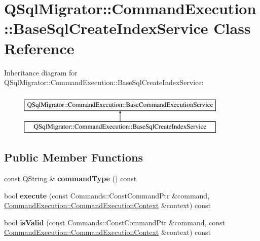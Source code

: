 \hypertarget{class_q_sql_migrator_1_1_command_execution_1_1_base_sql_create_index_service}{}\section{Q\+Sql\+Migrator\+:\+:Command\+Execution\+:\+:Base\+Sql\+Create\+Index\+Service Class Reference}
\label{class_q_sql_migrator_1_1_command_execution_1_1_base_sql_create_index_service}
Inheritance diagram for Q\+Sql\+Migrator\+:\+:Command\+Execution\+:\+:Base\+Sql\+Create\+Index\+Service\+:\begin{figure}[H]
\begin{center}
\leavevmode
\includegraphics[height=2.000000cm]{class_q_sql_migrator_1_1_command_execution_1_1_base_sql_create_index_service}
\end{center}
\end{figure}
\subsection*{Public Member Functions}
\begin{DoxyCompactItemize}
\item 
\mbox{\label{class_q_sql_migrator_1_1_command_execution_1_1_base_sql_create_index_service_aa4c885ce4f4967ba71149f80d0a711aa}} 
const Q\+String \& {\bfseries command\+Type} () const
\item 
\mbox{\label{class_q_sql_migrator_1_1_command_execution_1_1_base_sql_create_index_service_a90f6d3a4a67e8e721184e8c8709e2550}} 
bool {\bfseries execute} (const Commands\+::\+Const\+Command\+Ptr \&command, \hyperlink{class_q_sql_migrator_1_1_command_execution_1_1_command_execution_context}{Command\+Execution\+::\+Command\+Execution\+Context} \&context) const
\item 
\mbox{\label{class_q_sql_migrator_1_1_command_execution_1_1_base_sql_create_index_service_a56d2662eb7d74dfab2ebf0edcd4e388d}} 
bool {\bfseries is\+Valid} (const Commands\+::\+Const\+Command\+Ptr \&command, const \hyperlink{class_q_sql_migrator_1_1_command_execution_1_1_command_execution_context}{Command\+Execution\+::\+Command\+Execution\+Context} \&context) const
\end{DoxyCompactItemize}
